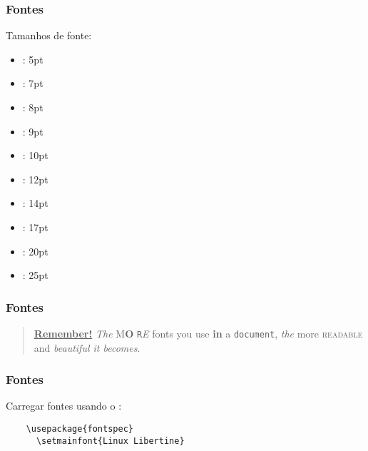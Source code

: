 \begin{frame}[fragile]
  \frametitle{Fontes}
  \large
  Tamanhos de fonte:
  \begin{multicols}{2}
    \begin{itemize}
      \item{: 5pt}
      \item{: 7pt}
      \item{: 8pt}
      \item{: 9pt}
      \item{: 10pt}
      \item{: 12pt}
      \item{: 14pt}
      \item{: 17pt}
      \item{: 20pt}
      \item{: 25pt}
    \end{itemize}
  \end{multicols}
\end{frame}

\begin{frame}
  \frametitle{Fontes}
  \begin{quote}
    \underline{\textbf{Remember\Huge!}} \textit{The}
    \textsf{M\textbf{\LARGE O} \texttt{R}\textsl{E}} fonts \Huge you
    \tiny use \footnotesize \textbf{in} a \small \texttt{document},
    \large \textit{the} \normalsize more \textsc{readable} and
    \textsl{\textsf{beautiful} it bec\large o\Large m\LARGE e\huge s}.
  \end{quote}
\end{frame}

\begin{frame}[fragile]
  \frametitle{Fontes}
  \large
  Carregar fontes usando o :

  \begin{verbatim}
    \usepackage{fontspec}
      \setmainfont{Linux Libertine}
  \end{verbatim}
\end{frame}

